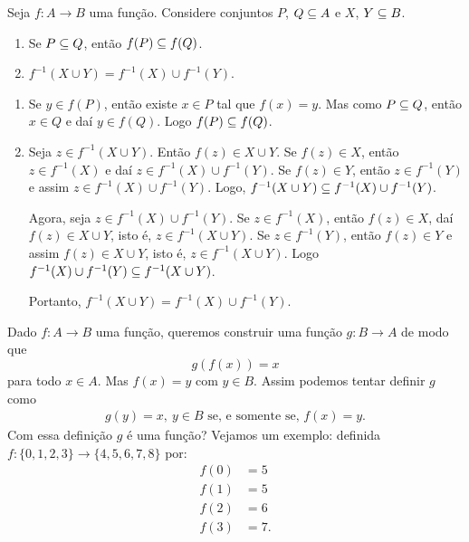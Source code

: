 \begin{proposicao}
    Seja $f : A \to B$ uma função. Considere conjuntos $P$, $Q \subseteq A$ e $X$, $Y \subseteq B$.
    \begin{enumerate}[label={\roman*})]
        \item Se $P \subseteq Q$, então $f(P) \subseteq f(Q)$.

        \item $f^{-1}(X \cup Y) = f^{-1}(X) \cup f^{-1}(Y)$.
    \end{enumerate}
\end{proposicao}
\begin{prova}
    \begin{enumerate}[label={\roman*})]
        \item Se $y \in f(P)$, então existe $x \in P$ tal que $f(x) = y$. Mas como $P \subseteq Q$, então $x \in Q$ e daí $y \in f(Q)$. Logo $f(P) \subseteq f(Q)$.

        \item Seja $z \in f^{-1}(X \cup Y)$. Então $f(z) \in X \cup Y$. Se $f(z) \in X$, então $z \in f^{-1}(X)$ e daí $z \in f^{-1}(X) \cup f^{-1}(Y)$. Se $f(z) \in Y$, então $z \in f^{-1}(Y)$ e assim $z \in f^{-1}(X) \cup f^{-1}(Y)$. Logo, $f^{-1}(X \cup Y) \subseteq f^{-1}(X) \cup f^{-1}(Y)$.

        Agora, seja $z \in f^{-1}(X) \cup f^{-1}(Y)$. Se $z \in f^{-1}(X)$, então $f(z) \in X$, daí $f(z) \in X \cup Y$, isto é, $z \in f^{-1}(X \cup Y)$. Se $z \in f^{-1}(Y)$, então $f(z) \in Y$ e assim $f(z) \in X \cup Y$, isto é, $z \in f^{-1}(X \cup Y)$. Logo $f^{-1}(X) \cup f^{-1}(Y) \subseteq f^{-1}(X \cup Y)$.

        Portanto, $f^{-1}(X \cup Y) = f^{-1}(X) \cup f^{-1}(Y)$.
    \end{enumerate}
\end{prova}


Dado $f : A \to B$ uma função, queremos construir uma função $g : B \to A$ de modo que
\[
    g(f(x)) = x
\]
para todo $x \in A$. Mas $f(x) = y$ com $y \in B$. Assim podemos tentar definir $g$ como
\begin{align}\label{condicao_funcao_inversa}
    g(y) = x,\ y \in B \mbox{ se, e somente se, } f(x) = y.
\end{align}
Com essa definição $g$ é uma função? Vejamos um exemplo: definida $f : \{0,1,2,3\} \to \{4,5,6,7,8\}$ por:
\begin{align*}
    f(0) &= 5\\
    f(1) &= 5\\
    f(2) &= 6\\
    f(3) &= 7.
\end{align*}

